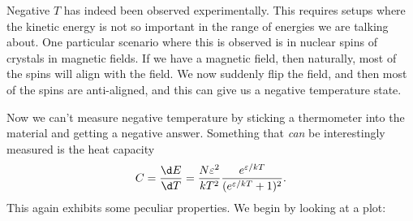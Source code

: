 \documentclass[a4paper]{article}
\begin{document}
\begin{eg}
  Negative $T$ has indeed been observed experimentally. This requires setups where the kinetic energy is not so important in the range of energies we are talking about. One particular scenario where this is observed is in nuclear spins of crystals in magnetic fields. If we have a magnetic field, then naturally, most of the spins will align with the field. We now suddenly flip the field, and then most of the spins are anti-aligned, and this can give us a negative temperature state.

  Now we can't measure negative temperature by sticking a thermometer into the material and getting a negative answer. Something that \emph{can} be interestingly measured is the heat capacity
  \[
    C = \frac{\d E}{\d T} = \frac{N\varepsilon^2}{ kT^2 } \frac{e^{\varepsilon/kT}}{(e^{\varepsilon/kT} + 1)^2}.
  \]
  This again exhibits some peculiar properties. We begin by looking at a plot:
  \begin{center}
\end{center}
\end{eg}
\end{document}
